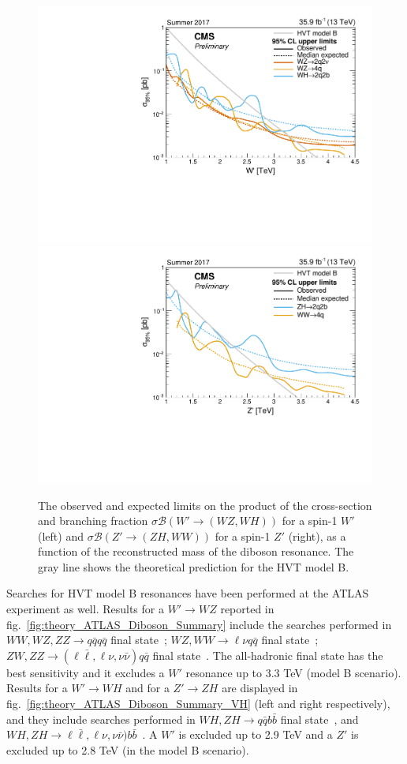 \begin{figure}[!htb]
  \centering
    \includegraphics[width=.495\textwidth]{figures/combiLimitsWprime_HVTB.pdf}%
    \includegraphics[width=.495\textwidth]{figures/combiLimitsZprime_HVTB.pdf}
  \caption{The observed and expected limits on the product of the cross-section and branching fraction $\sigma \mathcal{B} (W' \rightarrow (WZ, WH))$ for a spin-1 $W'$ (left) and $\sigma \mathcal{B} (Z' \rightarrow (ZH, WW))$ for a spin-1 $Z'$ (right), as a function of the reconstructed mass of the diboson resonance. The gray line shows the theoretical prediction for the HVT model B.}
  \label{fig:theory_CMS_Diboson_Summary_HVT}
\end{figure}



\noindent Searches for HVT model B resonances have been performed at the ATLAS experiment as well. Results for a $W' \rightarrow WZ$ reported in fig.~\ref{fig:theory_ATLAS_Diboson_Summary} include the searches performed in $WW, WZ, ZZ \rightarrow q \bar{q} q \bar{q}$ final state~\cite{Aaboud:2017eta}; $WZ, WW \rightarrow \ell \nu q \bar{q}$ final state~\cite{ATLAS-CONF-2017-051}; $ZW, ZZ \rightarrow (\ell \bar{\ell}, \ell \nu, \nu \bar{\nu}) q \bar{q}$ final state~\cite{ATLAS-CONF-2016-082}. The all-hadronic final state has the best sensitivity and it excludes a $W'$ resonance up to 3.3 TeV (model B scenario). Results for a $W' \rightarrow WH$ and for a $Z' \rightarrow ZH$ are displayed in fig.~\ref{fig:theory_ATLAS_Diboson_Summary_VH} (left and right respectively), and they include searches performed in $WH, ZH \rightarrow q \bar{q} b \bar{b}$ final state~\cite{Aaboud:2017ahz}, and $WH, ZH \rightarrow \ell \bar{\ell}, \ell \nu, \nu \bar{\nu}) b \bar{b}$~\cite{ATLAS-CONF-2017-055}. A $W'$ is excluded up to 2.9 TeV and a $Z'$ is excluded up to 2.8 TeV (in the model B scenario).

